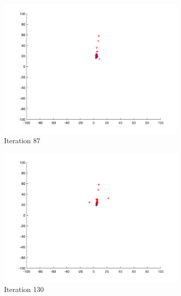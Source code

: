 \begin{figure}
\begin{subfigure}[b]{0.4\textwidth}
    \includegraphics[width=\textwidth]{img/smpl/rosn2d-9-100/loa-iter-87}
    \caption{Iteration 87}
    \label{fig:s6-iter-2}
  \end{subfigure}
  \begin{subfigure}[b]{0.4\textwidth}
    \includegraphics[width=\textwidth]{img/smpl/rosn2d-9-100/loa-iter-130}
    \caption{Iteration 130}
    \label{fig:s6-iter-3}
  \end{subfigure}
  \begin{subfigure}[b]{0.4\textwidth}

\end{subfigure}
\end{figure}
